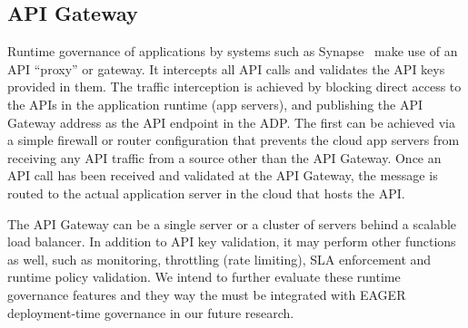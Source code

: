 \subsection{API Gateway} 
Runtime governance of applications by systems such as
Synapse~\cite{synapse} make use of an API ``proxy'' or gateway.
It
intercepts all API calls and validates the API keys provided in them. The
traffic interception is achieved by blocking direct access to the APIs in the
application runtime (app servers), and publishing the API Gateway address as
the API endpoint in the ADP. The first can be achieved via a simple firewall
or router configuration that prevents the cloud app servers from receiving any
API traffic from a source other than the API Gateway. Once an API call has
been received and validated at the API Gateway, the message is routed to the
actual application server in the cloud that hosts the API.

The API Gateway can be a single server or a cluster of servers 
behind a scalable load balancer. %
In addition to API key validation, it may perform other
functions as well, such as monitoring, throttling (rate limiting), SLA
enforcement and runtime policy validation. We intend to further evaluate these
runtime governance features and they way the must be integrated with
EAGER deployment-time governance
in our future research.
